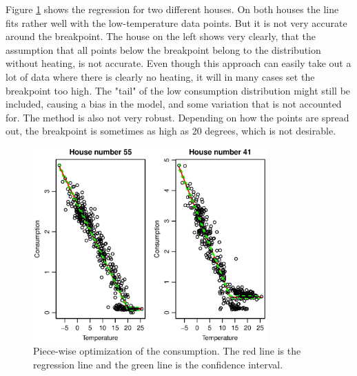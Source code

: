 \noindent Figure \ref{fig: Consumption-PW} shows the regression for two different houses. On both houses the
line fits rather well with the low-temperature data points. But it is not very accurate around the breakpoint.
The house on the left shows very clearly, that the assumption that all points below the breakpoint belong to 
the distribution without heating, is not accurate. Even though this approach can easily take out a lot of data
where there is clearly no heating, it will in many cases set the breakpoint too high. The "tail" of the low
consumption distribution might still be included, causing a bias in the model, and some variation that is not
accounted for. The method is also not very robust. Depending on how the points are spread out, the breakpoint
is sometimes as high as 20 degrees, which is not desirable.
\begin{figure}
    \centering
    \includegraphics[width=0.8\textwidth]{../../../figures/Consumption-PW.eps}
    \caption{Piece-wise optimization of the consumption. The red line is the regression line and the green line is the confidence interval.}
    \label{fig: Consumption-PW}
\end{figure}





